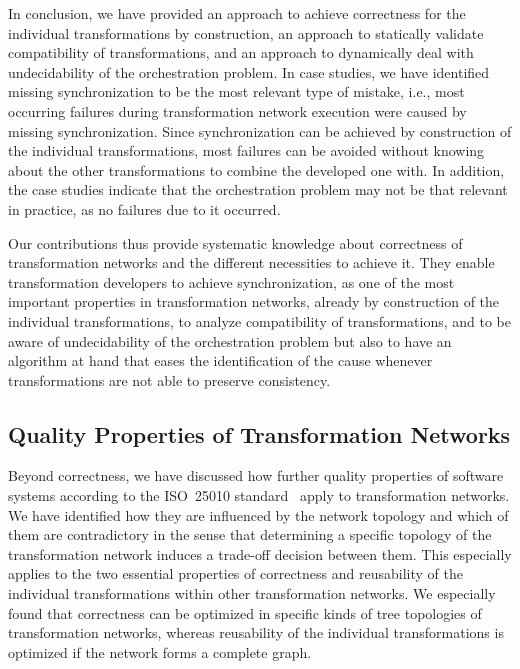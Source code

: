 In conclusion, we have provided an approach to achieve correctness for the individual transformations by construction, an approach to statically validate compatibility of transformations, and an approach to dynamically deal with undecidability of the orchestration problem.
In case studies, we have identified missing synchronization to be the most relevant type of mistake, i.e., most occurring failures during transformation network execution were caused by missing synchronization.
Since synchronization can be achieved by construction of the individual transformations, most failures can be avoided without knowing about the other transformations to combine the developed one with.
In addition, the case studies indicate that the orchestration problem may not be that relevant in practice, as no failures due to it occurred.

Our contributions thus provide systematic knowledge about correctness of transformation networks and the different necessities to achieve it.
They enable transformation developers to achieve synchronization, as one of the most important properties in transformation networks, already by construction of the individual transformations, to analyze compatibility of transformations, and to be aware of undecidability of the orchestration problem but also to have an algorithm at hand that eases the identification of the cause whenever transformations are not able to preserve consistency.


\subsection{Quality Properties of Transformation Networks}

Beyond correctness, we have discussed how further quality properties of software systems according to the ISO~25010 standard~\cite{iso25010} apply to transformation networks.
We have identified how they are influenced by the network topology and which of them are contradictory in the sense that determining a specific topology of the transformation network induces a trade-off decision between them.
This especially applies to the two essential properties of correctness and reusability of the individual transformations within other transformation networks.
We especially found that correctness can be optimized in specific kinds of tree topologies of transformation networks, whereas reusability of the individual transformations is optimized if the network forms a complete graph.

